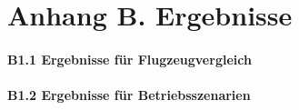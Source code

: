 \chapter{Anhang B. Ergebnisse}
\subsubsection{B1.1 Ergebnisse für Flugzeugvergleich}




\subsubsection{B1.2 Ergebnisse für Betriebsszenarien}